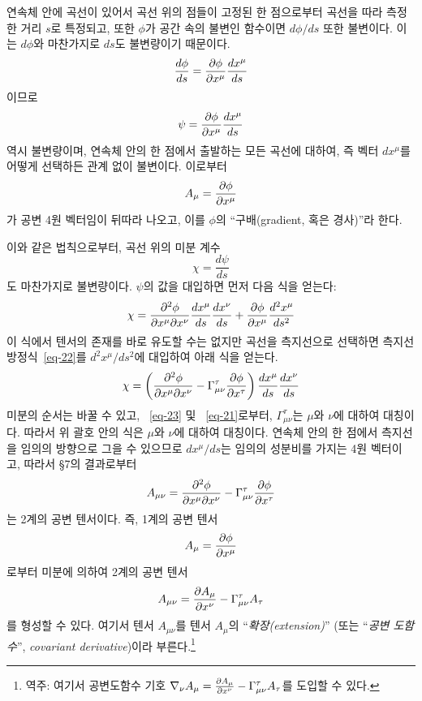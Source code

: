 연속체 안에 곡선이 있어서 곡선 위의 점들이 고정된 한 점으로부터 곡선을 따라 측정한 거리 $s$로 특정되고, 또한 $\phi$가 공간 속의 불변인 함수이면 $d\phi/ds$ 또한 불변이다. 이는 $d\phi$와 마찬가지로 $ds$도 불변량이기 때문이다.
\begin{equation*}
	\dfrac{d\phi}{ds}={\frac{{\partial}{\phi}}{{\partial}{x^\mu}}} \dfrac{dx^\mu}{ds}
\end{equation*} 
이므로
\begin{equation*}
	\psi={\frac{{\partial}{\phi}}{{\partial}{x^\mu}}} \dfrac{dx^\mu}{ds}
\end{equation*} 
역시 불변량이며, 연속체 안의 한 점에서 출발하는 모든 곡선에 대하여, 즉 벡터 $ dx^\mu $를 어떻게 선택하든 관계 없이 불변이다. 이로부터
\begin{equation} \label{eq-24}
	A_\mu={\frac{{\partial}{\phi}}{{\partial}{x^\mu}}}
\end{equation}
가 공변 4원 벡터임이 뒤따라 나오고, 이를 $\phi$의 ``구배(gradient, 혹은 경사)''라 한다.\par
이와 같은 법칙으로부터, 곡선 위의 미분 계수
\begin{equation*}
	\chi=\dfrac{d\psi}{ds}
\end{equation*}
도 마찬가지로 불변량이다. $\psi$의 값을 대입하면 먼저 다음 식을 얻는다:
\begin{equation*}
	\chi={\frac{{\partial^2}{\phi}}{{\partial}{x^\mu}{\partial}{x^\nu}}} \dfrac{dx^\mu}{ds} \dfrac{dx^\nu}{ds} 
	+ {\frac{{\partial}{\phi}}{{\partial}{x^\mu}}} \dfrac{d^2 x^\mu}{ds^2}
\end{equation*}
이 식에서 텐서의 존재를 바로 유도할 수는 없지만 곡선을 측지선으로 선택하면 측지선 방정식~\eqref{eq-22}를 $d^2 x^\mu / ds^2$에 대입하여 아래 식을 얻는다.
\begin{equation*}
	\chi=\left( {\frac{{\partial^2}{\phi}}{{\partial}{x^\mu}{\partial}{x^\nu}}}  
	- \Gamma_{\mu\nu}^\tau {\frac{{\partial}{\phi}}{{\partial}{x^\tau}}} 
	\right) \dfrac{dx^\mu}{ds} \dfrac{dx^\nu}{ds}
\end{equation*}
미분의 순서는 바꿀 수 있고, ~\eqref{eq-23} 및 ~\eqref{eq-21}로부터, $\Gamma_{\mu\nu}^\tau$는 \Index{} $\mu$와 $\nu$에 대하여 대칭이다. 따라서 위 괄호 안의 식은 $\mu$와 $\nu$에 대하여 대칭이다. 연속체 안의 한 점에서 측지선을 임의의 방향으로 그을 수 있으므로 $dx^\mu/ds$는 임의의 성분비를 가지는 4원 벡터이고, 따라서 \S 7의 결과로부터
\begin{equation} \label{eq-25}
	A_{\mu\nu} = {\frac{{\partial^2}{\phi}}{{\partial}{x^\mu}{\partial}{x^\nu}}}  
	- \Gamma_{\mu\nu}^\tau {\frac{{\partial}{\phi}}{{\partial}{x^\tau}}} 
\end{equation}
는 2계의 공변 텐서이다.
즉, 1계의 공변 텐서
\begin{equation*}
	A_\mu={\frac{{\partial}{\phi}}{{\partial}{x^\mu}}}
\end{equation*}
로부터 미분에 의하여 2계의 공변 텐서
\begin{equation} \label{eq-26}
	A_{\mu\nu} = {\frac{{\partial}{A_\mu}}{{\partial}{x^\nu}}} 
	- \Gamma_{\mu\nu}^\tau A_\tau
\end{equation}
를 형성할 수 있다. 여기서 텐서 $A_{\mu\nu}$를 텐서 $A_\mu$의 ``\emph{확장(extension)}'' (또는 ``\emph{공변 도함수}'', \emph{covariant derivative})이라 부른다.\footnote{역주: 여기서 공변도함수 기호 $\nabla_\nu A_\mu={\frac{{\partial}{A_\mu}}{{\partial}{x^\nu}}} - \Gamma_{\mu\nu}^\tau A_\tau$를 도입할 수 있다.}

